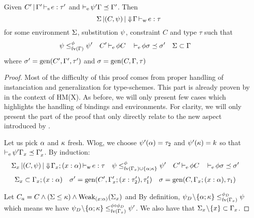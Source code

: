 \begin{theorem}[Completeness]
  Given $C' \operatorname{|} \Gamma' \operatorname{\vdash_s} e : \tau'$ and
  $\operatorname{\vdash_e} \mathrm{\psi}'\Gamma \preceq \Gamma'$.
  Then $$\Sigma \operatorname{|} (C,\mathrm{\psi}) \operatorname{|} \Downarrow\!\Gamma \operatorname{\vdash_w} e : \tau$$
  for some environment $\Sigma$,
  substitution $\mathrm{\psi}$, constraint $C$ and type $\tau$ such
  that
  \begin{align*}
    \mathrm{\psi} &\leq^{\phi}_{\operatorname{fv}(\Gamma)} \mathrm{\psi}'
    &C'& \operatorname{\vdash_e} \phi C
    && \operatorname{\vdash_e} \phi \sigma \preceq \sigma'
    &\Sigma&\subset\Gamma
  \end{align*}
  where $\sigma' = \operatorname{\text{gen}}(C',\Gamma',\tau')$
  and $\sigma = \operatorname{\text{gen}}(C,\Gamma,\tau)$
\end{theorem}
\begin{proof}
  Most of the difficulty of this proof comes from proper handling of
  instanciation and generalization for type-schemes.
  This part is already proven
  by \citet{sulzmann1997proofs} in the context
  of HM(X). As before, we will only present few cases
  which highlights the handling of bindings and environments.
  For clarity, we will only present the part of the proof that
  only directly relate to the new aspect introduced by \lang.
  \\





  Let us pick $\alpha$ and $\kappa$ fresh.
  Wlog, we choose $\mathrm{\psi}'(\alpha) = \tau_2$ and $\mathrm{\psi}'(\kappa) = k$
  so that $\operatorname{\vdash_e} \mathrm{\psi}'\Gamma_x \preceq \Gamma'_x$.
  By induction:
  \begin{align*}
    \Sigma_x \operatorname{|} (C,\mathrm{\psi}) \operatorname{|} \Downarrow\!\Gamma_x;(x : \alpha)& \operatorname{\vdash_w} e : \tau
    &\mathrm{\psi} &\leq^{\phi}_{\operatorname{fv}(\Gamma_x)\cup\{\alpha;\kappa\}} \mathrm{\psi}'
    &C'& \operatorname{\vdash_e} \phi C
    && \operatorname{\vdash_e} \phi \sigma \preceq \sigma'
  \end{align*}
  \begin{align*}
    \Sigma_x&\subset\Gamma_x;(x : \alpha)
    &\sigma' &= \operatorname{\text{gen}}(C',\Gamma_x';(x : \tau'_2),\tau'_1)
    &\sigma &= \operatorname{\text{gen}}(C,\Gamma_x;(x : \alpha),\tau_1)
  \end{align*}

  Let $C_a = C\wedge (\Sigma \leq \kappa) \wedge \operatorname{Weak}_{(x : \alpha)}(\Sigma_x)$
  and
  By definition, $\mathrm{\psi}_D\!\setminus\!\{\alpha;\kappa\} \leq^{\phi_D}_{\operatorname{fv}(\Gamma_x)} \mathrm{\psi}$
  which means we have
  $\mathrm{\psi}_D\!\setminus\!\{\alpha;\kappa\} \leq^{\phi\circ\phi_D}_{\operatorname{fv}(\Gamma_x)} \mathrm{\psi}'$.
  We also have that $\Sigma_x\!\setminus\!\{x\}\subset \Gamma_x$.


\end{proof}
